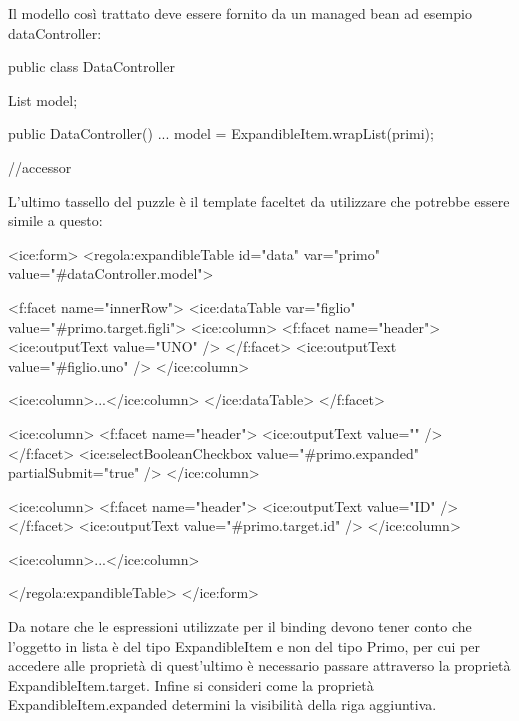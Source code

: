 Il modello così trattato deve essere fornito da un managed bean ad esempio dataController:

\begin{java}
public class DataController {

  List model;
  
  public DataController()
  {
            ...
    model = ExpandibleItem.wrapList(primi);
  }

  //accessor
  
}
\end{java}

L'ultimo tassello del puzzle è il template faceltet da utilizzare che potrebbe essere simile a questo:

\begin{xml}
<ice:form>
   <regola:expandibleTable id="data" var="primo" value="#{dataController.model}">

  <f:facet name="innerRow">
      <ice:dataTable var="figlio" value="#{primo.target.figli}">
    <ice:column>
      <f:facet name="header">
        <ice:outputText value="UNO" />
      </f:facet>
          <ice:outputText value="#{figlio.uno}" />
        </ice:column>

    <ice:column>...</ice:column>
     </ice:dataTable>
     </f:facet>

      <ice:column>
    <f:facet name="header">
    <ice:outputText value="" />
    </f:facet>
    <ice:selectBooleanCheckbox value="#{primo.expanded}"
            partialSubmit="true" />
    </ice:column>

    <ice:column>
       <f:facet name="header">
          <ice:outputText value="ID" />
       </f:facet>
       <ice:outputText value="#{primo.target.id}" />
    </ice:column>


    <ice:column>...</ice:column>
          
    </regola:expandibleTable>
</ice:form>
\end{xml}


Da notare che le espressioni utilizzate per il binding devono tener conto che l'oggetto in lista è del tipo ExpandibleItem  e non del tipo Primo, per cui per accedere alle proprietà di quest'ultimo è necessario passare attraverso la proprietà ExpandibleItem.target. Infine si consideri come la proprietà  ExpandibleItem.expanded determini la visibilità della riga aggiuntiva.
